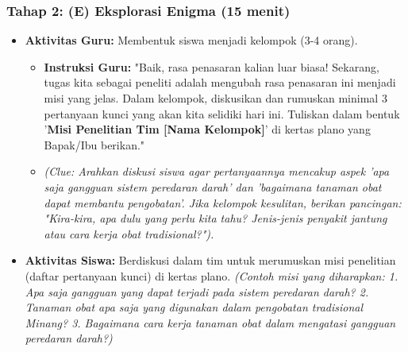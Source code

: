 \documentclass[a4paper,12pt]{article}
\begin{document}
\subsubsection{Tahap 2: (E) Eksplorasi Enigma (15 menit)}
\begin{itemize}
\item \textbf{Aktivitas Guru:} Membentuk siswa menjadi kelompok (3-4 orang).
    \begin{itemize}
    \item \textbf{Instruksi Guru:} "Baik, rasa penasaran kalian luar biasa! Sekarang, tugas kita sebagai peneliti adalah mengubah rasa penasaran ini menjadi misi yang jelas. Dalam kelompok, diskusikan dan rumuskan minimal 3 pertanyaan kunci yang akan kita selidiki hari ini. Tuliskan dalam bentuk '\textbf{Misi Penelitian Tim [Nama Kelompok]}' di kertas plano yang Bapak/Ibu berikan."
    \item \textit{(Clue: Arahkan diskusi siswa agar pertanyaannya mencakup aspek 'apa saja gangguan sistem peredaran darah' dan 'bagaimana tanaman obat dapat membantu pengobatan'. Jika kelompok kesulitan, berikan pancingan: "Kira-kira, apa dulu yang perlu kita tahu? Jenis-jenis penyakit jantung atau cara kerja obat tradisional?").}
    \end{itemize}
\item \textbf{Aktivitas Siswa:} Berdiskusi dalam tim untuk merumuskan misi penelitian (daftar pertanyaan kunci) di kertas plano. \textit{(Contoh misi yang diharapkan: 1. Apa saja gangguan yang dapat terjadi pada sistem peredaran darah? 2. Tanaman obat apa saja yang digunakan dalam pengobatan tradisional Minang? 3. Bagaimana cara kerja tanaman obat dalam mengatasi gangguan peredaran darah?)}
\end{itemize}
\end{document}
